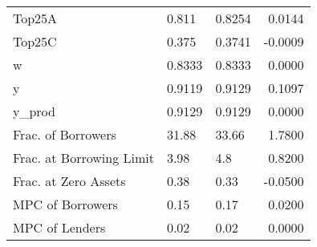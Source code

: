 \begin{table}
\begin{tabular}{lllr}
                  Top25A &   0.811 &   0.8254 &  0.0144 \\
                  Top25C &   0.375 &   0.3741 & -0.0009 \\
                       w &  0.8333 &   0.8333 &  0.0000 \\
                       y &  0.9119 &   0.9129 &  0.1097 \\
                  y\_prod &  0.9129 &   0.9129 &  0.0000 \\
      Frac. of Borrowers &   31.88 &    33.66 &  1.7800 \\
Frac. at Borrowing Limit &    3.98 &      4.8 &  0.8200 \\
    Frac. at Zero Assets &    0.38 &     0.33 & -0.0500 \\
        MPC of Borrowers &    0.15 &     0.17 &  0.0200 \\
          MPC of Lenders &    0.02 &     0.02 &  0.0000 \\
\bottomrule
\end{tabular}
\end{table}
